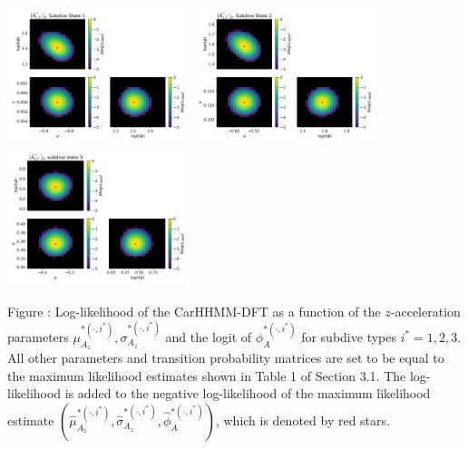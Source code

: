 \documentclass{article}
\begin{document}
        \begin{center}
        \includegraphics[width=2.1in]{../Plots/2019/20190902-182840-CATs_OB_1_0_267_CarHHMM2_fine-theta-likelihood-Az-0.png}
        \includegraphics[width=2.1in]{../Plots/2019/20190902-182840-CATs_OB_1_0_267_CarHHMM2_fine-theta-likelihood-Az-1.png}
        \includegraphics[width=2.1in]{../Plots/2019/20190902-182840-CATs_OB_1_0_267_CarHHMM2_fine-theta-likelihood-Az-2.png}
        \end{center}
        
        \noindent Figure : Log-likelihood of the CarHHMM-DFT as a function of the $z$-acceleration parameters $\mu_{A_z}^{*(\cdot,i^*)}, \sigma_{A_z}^{*(\cdot,i^*)}$ and the logit of $\phi_{A}^{*(\cdot,i^*)}$ for subdive types $i^* = 1,2,3$. All other parameters and transition probability matrices are set to be equal to the maximum likelihood estimates shown in Table 1 of Section 3.1. The log-likelihood is added to the negative log-likelihood of the maximum likelihood estimate $(\hat \mu_{A_z}^{*(\cdot,i^*)}, \hat \sigma_{A_z}^{*(\cdot,i^*)}, \hat \phi_{A}^{*(\cdot,i^*)})$, which is denoted by red stars.
        \addtocounter{fignum}{1}
        
        \newpage
        
\end{document}
